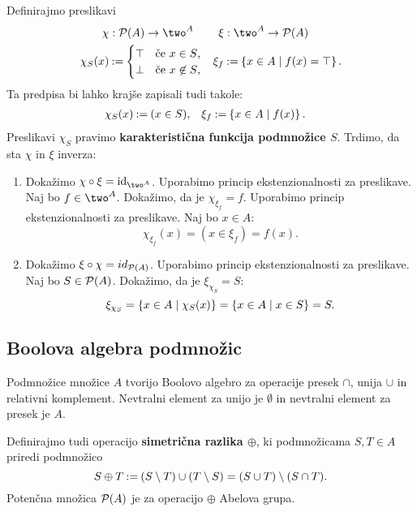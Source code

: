 \begin{dokaz}
  Definirajmo preslikavi
  \begin{align*}
    \chi &: \pow{A} \to \two^A &
    \xi &: \two^A \to \pow{A} \\
    \chi_S(x) &\defeq
      \begin{cases}
        \top & \text{če $x \in S$,} \\
        \bot & \text{če $x \not\in S$,}
      \end{cases}
    &
    \xi_f &\defeq \set{x \in A \such f(x) = \top}.
  \end{align*}
  Ta predpisa bi lahko krajše zapisali tudi takole:
  \begin{align*}
  \chi_S(x) &\mathbin{{:}{=}} (x \in S), &
  \xi_f &\mathbin{{:}{=}} \left\{x \in A \; \middle| \; f(x) \right\}.
  \end{align*}
  Preslikavi $\chi_S$ pravimo \textbf{karakteristična funkcija podmnožice $S$}.
  Trdimo, da sta $\chi$ in $\xi$ inverza:
  \begin{enumerate}
  \item 
    Dokažimo $\chi \circ \xi = \id[\two^A]$. Uporabimo princip ekstenzionalnosti za preslikave.
    Naj bo $f \in \two^A$. Dokažimo, da je $\chi_{\xi_f} = f$.
    Uporabimo princip ekstenzionalnosti za preslikave. Naj bo $x \in A$:
    \begin{equation*}
      \chi_{\xi_f}(x) = (x \in \xi_f) = f(x).
    \end{equation*}

  \item
    Dokažimo $\xi \circ \chi = id_{\mathcal{P}(A)}$. Uporabimo princip ekstenzionalnosti za preslikave. Naj bo $S \in \mathcal{P}(A)$. Dokažimo, da je $\xi_{\chi_S} = S$:
    \begin{equation*}
      \xi_{\chi_S} = \left\{x \in A \; \middle| \; \chi_S(x)\right\} = \left\{x \in A \; \middle| \; x \in S\right\} = S.
    \end{equation*}
  \end{enumerate}
\end{dokaz}

\subsection{Boolova algebra podmnožic}

Podmnožice množice $A$ tvorijo Boolovo algebro za operacije presek $\cap$, unija $\cup$ in relativni komplement. Nevtralni element za unijo je $\emptyset$ in nevtralni element za presek je $A$.

Definirajmo tudi operacijo \textbf{simetrična razlika $\oplus$}, ki podmnožicama $S, T \in A$ priredi podmnožico
%
\begin{equation*}
  S \oplus T \mathbin{{:}{=}} (S \setminus T) \cup (T \setminus S) = (S \cup T) \setminus (S \cap T).
\end{equation*}
%
Potenčna množica $\mathcal{P}(A)$ je za operacijo $\oplus$ Abelova grupa.
